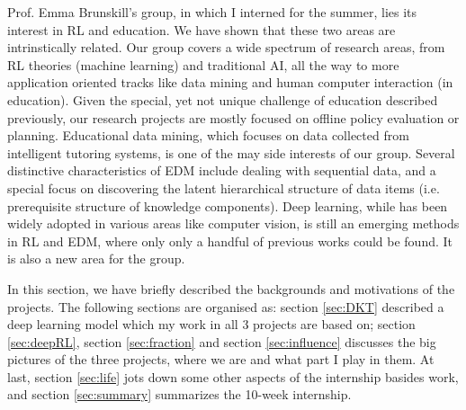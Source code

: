 Prof. Emma Brunskill's group, in which I interned for the summer, lies its interest in RL and education. We have shown that these two areas are intrinstically related. Our group covers a wide spectrum of research areas, from RL theories (machine learning) and traditional AI, all the way to more application oriented tracks like data mining and human computer interaction (in education). Given the special, yet not unique challenge of education described previously, our research projects are mostly focused on offline policy evaluation or planning. Educational data mining, which focuses on data collected from intelligent tutoring systems, is one of the may side interests of our group. Several distinctive characteristics of EDM include dealing with sequential data, and a special focus on discovering the latent hierarchical structure of data items (i.e. prerequisite structure of knowledge components). Deep learning, while has been widely adopted in various areas like computer vision, is still an emerging methods in RL and EDM, where only only a handful of previous works could be found. It is also a new area for the group.

In this section, we have briefly described the backgrounds and motivations of the projects. The following sections are organised as: section \ref{sec:DKT} described a deep learning model which my work in all 3 projects are based on; section \ref{sec:deepRL}, section \ref{sec:fraction} and section \ref{sec:influence} discusses the big pictures of the three projects, where we are and what part I play in them. At last, section \ref{sec:life} jots down some other aspects of the internship basides work, and section \ref{sec:summary} summarizes the 10-week internship.









